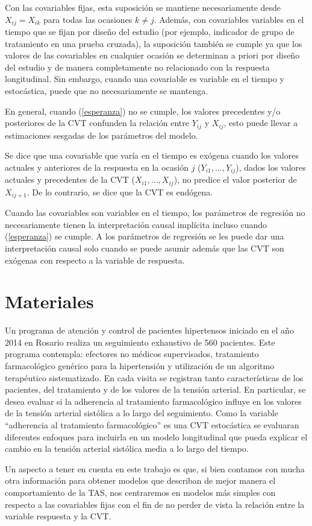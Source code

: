 \documentclass[12pt]{article}
\def\npatients{560}
\def\fullcovname{adherencia al tratamiento farmacológico}
\def\cvt{covariable que varía en el tiempo}
\def\xseqj{$X_{i1}, ..., X_{ij}$}
\def\yseqj{$Y_{i1}, ..., Y_{ij}$}
\begin{document}
Con las covariables fijas, esta suposición se mantiene necesariamente desde $X_{ij} = X_{ik}$ para todas las ocasiones
$k \neq j$. Además, con covariables variables en el tiempo que se fijan por diseño del estudio (por ejemplo, indicador
de grupo de tratamiento en una prueba cruzada), la suposición también se cumple ya que los valores de las covariables
en cualquier ocasión se determinan a priori por diseño del estudio y de manera completamente no relacionado con la
respuesta longitudinal. Sin embargo, cuando una covariable es variable en el tiempo y estocástica, puede que no
necesariamente se mantenga.

En general, cuando (\ref{esperanza}) no se cumple, los valores precedentes y/o posteriores de la CVT confunden la
relación entre $Y_{ij}$ y $X_{ij}$, esto puede llevar a estimaciones sesgadas de los parámetros del modelo.

Se dice que una \cvt{} es exógena cuando los valores actuales y anteriores de la respuesta en la ocasión
$j$ (\yseqj{}), dados los valores actuales y precedentes de la CVT (\xseqj{}), no predice el valor
posterior de $X_{ij+1}$. De lo contrario, se dice que la CVT es endógena.

Cuando las covariables son variables en el tiempo, los parámetros de regresión no
necesariamente tienen la interpretación causal implícita incluso cuando (\ref{esperanza}) se cumple. A los parámetros de
regresión se les puede dar una interpretación causal solo cuando se puede asumir además que las CVT son exógenas con
respecto a la variable de respuesta.

\newpage
\section{Materiales}

Un programa de atención y control de pacientes hipertensos iniciado en el año 2014 en Rosario realiza un seguimiento
exhaustivo de \npatients{} pacientes. Este programa contempla: efectores no médicos supervisados, tratamiento farmacológico
genérico para la hipertensión y utilización de un algoritmo terapéutico sistematizado. En cada visita se registran tanto
características de los pacientes, del tratamiento y de los valores de la tensión arterial. En particular, se desea evaluar
si la adherencia al tratamiento farmacológico influye en los valores de la tensión arterial sistólica a lo largo del
seguimiento. Como la variable “\fullcovname{}” es una CVT estocástica se evaluaran diferentes enfoques para incluirla en un
modelo longitudinal que pueda explicar el cambio en la tensión arterial sistólica media a lo largo del tiempo.

Un aspecto a tener en cuenta en este trabajo es que, si bien contamos con mucha otra información para
obtener modelos que describan de mejor manera el comportamiento de la TAS, nos centraremos en modelos más simples con
respecto a las covariables fijas con el fin de no perder de vista la relación entre la variable respuesta y la CVT.

\newpage
\nocite{*}
\renewcommand{\refname}{Bibliografía}

\end{document}
